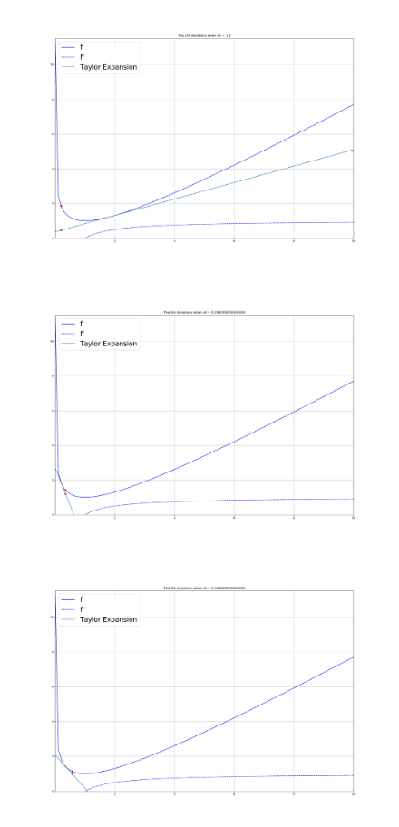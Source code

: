 \documentclass{article}
\theoremstyle{definition}
\theoremstyle{definition}
\theoremstyle{remark}
\begin{document}
\begin{enumerate}
\begin{figure}[H]
        \includegraphics[scale=0.25]{f41.png}
    \end{figure}
    \begin{figure}[H]
        \centering
        \includegraphics[scale=0.25]{f42.png}
    \end{figure}
    \begin{figure}[H]
        \centering
        \includegraphics[scale=0.25]{f43.png}

\end{figure}
\end{enumerate}
\end{document}
